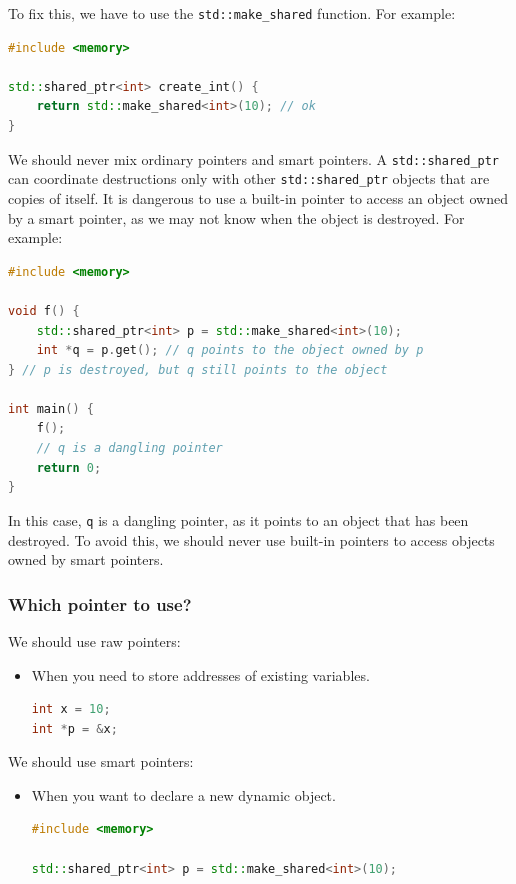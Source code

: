 To fix this, we have to use the \texttt{std::make\_shared} function. For example:

\begin{lstlisting}[language=C++]
#include <memory>

std::shared_ptr<int> create_int() {
    return std::make_shared<int>(10); // ok
}
\end{lstlisting}

We should never mix ordinary pointers and smart pointers. A \texttt{std::shared\_ptr} can coordinate
destructions only with other \texttt{std::shared\_ptr} objects that are copies of itself. It is
dangerous to use a built-in pointer to access an object owned by a smart pointer, as we may not
know when the object is destroyed. For example:

\begin{lstlisting}[language=C++]
#include <memory>

void f() {
    std::shared_ptr<int> p = std::make_shared<int>(10);
    int *q = p.get(); // q points to the object owned by p
} // p is destroyed, but q still points to the object

int main() {
    f();
    // q is a dangling pointer
    return 0;
}
\end{lstlisting}

In this case, \texttt{q} is a dangling pointer, as it points to an object that has been destroyed. 
To avoid this, we should never use built-in pointers to access objects owned by smart pointers.

\subsubsection{Which pointer to use?}

We should use raw pointers:

\begin{itemize}
    \item When you need to store addresses of existing variables.
\begin{lstlisting}[language=C++]
int x = 10;
int *p = &x;
\end{lstlisting}

\end{itemize}

We should use smart pointers:

\begin{itemize}
    \item When you want to declare a new dynamic object.
\begin{lstlisting}[language=C++]
#include <memory>

std::shared_ptr<int> p = std::make_shared<int>(10);
\end{lstlisting}

\end{itemize}

